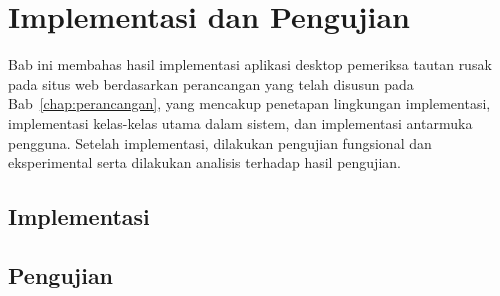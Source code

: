 \chapter{Implementasi dan Pengujian}
\label{chap:implementasi-dan-pengujian}

Bab ini membahas hasil implementasi aplikasi desktop pemeriksa tautan rusak pada situs web berdasarkan perancangan yang telah disusun pada Bab~\ref{chap:perancangan}, yang mencakup penetapan lingkungan implementasi, implementasi kelas-kelas utama dalam sistem, dan implementasi antarmuka pengguna. Setelah implementasi, dilakukan pengujian fungsional dan eksperimental serta dilakukan analisis terhadap hasil pengujian.

\section{Implementasi}
\label{sec:05-implementasi}
% 


\section{Pengujian}
\label{sec:05-pengujian}
% 


